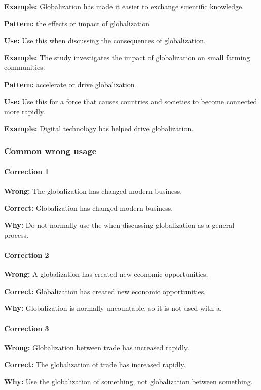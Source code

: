 \documentclass[11pt]{article}
\begin{document}
\textbf{Example:} Globalization has made it easier to exchange scientific knowledge.

\textbf{Pattern:} the effects or impact of globalization

\textbf{Use:} Use this when discussing the consequences of globalization.

\textbf{Example:} The study investigates the impact of globalization on small farming communities.

\textbf{Pattern:} accelerate or drive globalization

\textbf{Use:} Use this for a force that causes countries and societies to become connected more rapidly.

\textbf{Example:} Digital technology has helped drive globalization.

\subsubsection{Common wrong usage}
\paragraph{Correction 1}
\textbf{Wrong:} The globalization has changed modern business.

\textbf{Correct:} Globalization has changed modern business.

\textbf{Why:} Do not normally use the when discussing globalization as a general process.

\paragraph{Correction 2}
\textbf{Wrong:} A globalization has created new economic opportunities.

\textbf{Correct:} Globalization has created new economic opportunities.

\textbf{Why:} Globalization is normally uncountable, so it is not used with a.

\paragraph{Correction 3}
\textbf{Wrong:} Globalization between trade has increased rapidly.

\textbf{Correct:} The globalization of trade has increased rapidly.

\textbf{Why:} Use the globalization of something, not globalization between something.
\end{document}
